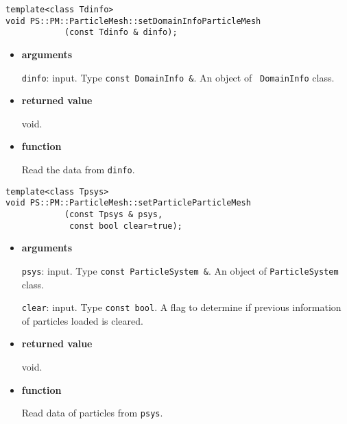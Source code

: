 
\begin{screen}
\begin{verbatim}
template<class Tdinfo>
void PS::PM::ParticleMesh::setDomainInfoParticleMesh
            (const Tdinfo & dinfo);
\end{verbatim}
\end{screen}

\begin{itemize}

\item {\bf arguments}

{\tt dinfo}: input. Type {\tt const DomainInfo \&}. An object of {\tt
DomainInfo} class.


\item {\bf returned value}

void.

\item {\bf function}

Read the data from {\tt dinfo}.

\end{itemize}


\begin{screen}
\begin{verbatim}
template<class Tpsys>
void PS::PM::ParticleMesh::setParticleParticleMesh
            (const Tpsys & psys,
             const bool clear=true);
\end{verbatim}
\end{screen}

\begin{itemize}

\item {\bf arguments}

{\tt psys}: input. Type {\tt const ParticleSystem \&}. An object of
{\tt ParticleSystem} class.

{\tt clear}: input. Type {\tt const bool}. A flag to determine if
previous information of particles loaded is cleared.



\item {\bf returned value}

void.

\item {\bf function}

Read data of particles from {\tt psys}.

\end{itemize}

